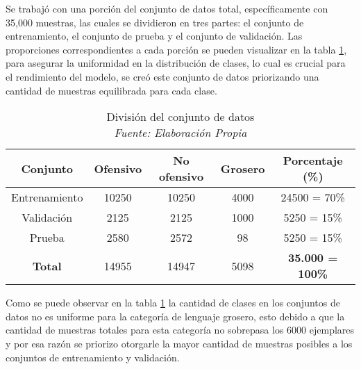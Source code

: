 Se trabajó con una porción del conjunto de datos total, específicamente con 35,000 muestras, las cuales se dividieron en tres partes: el conjunto de entrenamiento, el conjunto de prueba y el conjunto de validación. Las proporciones correspondientes a cada porción se pueden visualizar en la tabla \ref{tbl:conjuntos}, para asegurar la uniformidad en la distribución de clases, lo cual es crucial para el rendimiento del modelo, se creó este conjunto de datos priorizando una cantidad de muestras equilibrada para cada clase.


\begin{table}[!ht]
	\centering
	\begin{tabular}{|c|c|c|c|c|}
		\hline
		\textbf{Conjunto} & \textbf{Ofensivo} & \textbf{No ofensivo} & \textbf{Grosero} & \textbf{Porcentaje (\%)} \\ \hline
		Entrenamiento & 10250 & 10250 & 4000 & 24500 = 70\% \\ 
		Validación & 2125 & 2125 & 1000 & 5250 = 15\% \\ 
		Prueba & 2580 & 2572 & 98 & 5250 = 15\% \\ \hline
		\textbf{Total} & 14955 & 14947 & 5098 & \textbf{35.000 = 100\%} \\ \hline
	\end{tabular}
	\caption[División del conjunto de datos]{División del conjunto de datos
		\\\textit{Fuente: Elaboración Propia}}
	\label{tbl:conjuntos}
\end{table}


Como se puede observar en la tabla \ref{tbl:conjuntos} la cantidad de clases en los conjuntos de datos no es uniforme para la categoría de lenguaje grosero, esto debido a que la cantidad de muestras totales para esta categoría no sobrepasa los 6000 ejemplares y por esa razón se priorizo otorgarle la mayor cantidad de muestras posibles a los conjuntos de entrenamiento y validación.